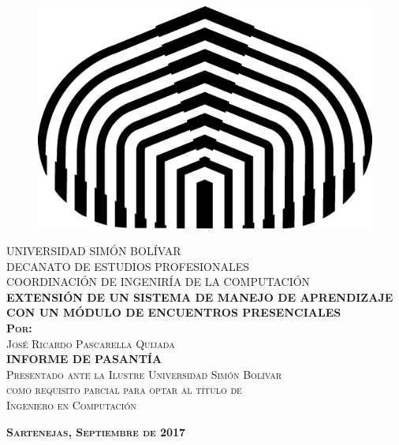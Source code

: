\begin{titlepage}
\begin{center}

\begin{figure}[h]
\begin{center}
\includegraphics{Logos/logoUSB.png}
\end{center}
\end{figure}

\textsc{UNIVERSIDAD SIMÓN BOLÍVAR}\\
\textsc{DECANATO DE ESTUDIOS PROFESIONALES}\\
\textsc{COORDINACIÓN DE INGENIRÍA DE LA COMPUTACIÓN}\\[8em]

\textsc{\Large \textbf{EXTENSIÓN DE UN SISTEMA DE MANEJO DE APRENDIZAJE CON UN MÓDULO DE ENCUENTROS PRESENCIALES}}\\[4em]

\textsc{ \textbf{Por:} }\\
\textsc{José Ricardo Pascarella Quijada}\\[4em]

\textsc{ \textbf{INFORME DE PASANTÍA} }\\
\textsc{Presentado ante la Ilustre Universidad Simón Bolívar}\\
\textsc{como requisito parcial para optar al título de }\\
\textsc{Ingeniero en Computación}

\vspace*{\fill}

\textsc{ \textbf{Sartenejas, Septiembre de 2017} }
\end{center}
\end{titlepage}